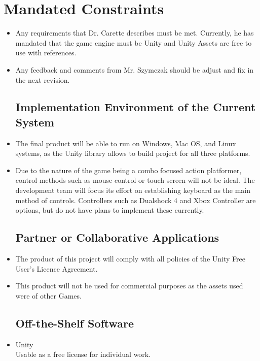 \documentclass{article}
\begin{document}
	\section{Mandated Constraints}
	\begin{itemize}
	\subsection{Solution Constraints}
	\item Any requirements that Dr. Carette describes must be met. Currently, he has mandated that the game engine must be Unity and Unity Assets are free to use with references.
	\item Any feedback and comments from Mr. Szymczak should be adjust and fix in the next revision.

	\subsection{Implementation Environment of the Current System}
	\item The final product will be able to run on Windows, Mac OS, and Linux systems, as the Unity library allows to build project for all three platforms.
	\item Due to the nature of the game being a combo focused action platformer, control methods such as mouse control or touch screen will not be ideal. The development team will focus its effort on establishing keyboard as the main method of controls. Controllers such as Dualshock 4 and Xbox Controller are options, but do not have plans to implement these currently.

	\subsection{Partner or Collaborative Applications}
	\item The product of this project will comply with all policies of the Unity Free User's Licence Agreement.
	\item This product will not be used for commercial purposes as the assets used were of other Games.

	\subsection{Off-the-Shelf Software}
	\item Unity\\
	Usable as a free license for individual work.


\end{itemize}
\end{document}
